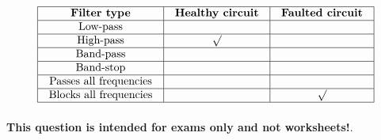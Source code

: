 $$\vbox{\offinterlineskip
\halign{\strut
\vrule \quad\hfil # \ \hfil & 
\vrule \quad\hfil # \ \hfil & 
\vrule \quad\hfil # \ \hfil \vrule \cr
\noalign{\hrule}
%
{\bf Filter type} & {\bf Healthy circuit} & {\bf Faulted circuit} \cr
%
\noalign{\hrule}
%
Low-pass &  &  \cr
%
\noalign{\hrule}
%
High-pass & $\surd$ &  \cr
%
\noalign{\hrule}
%
Band-pass &  &  \cr
%
\noalign{\hrule}
%
Band-stop &  &  \cr
%
\noalign{\hrule}
%
Passes all frequencies &  &  \cr
%
\noalign{\hrule}
%
Blocks all frequencies &  & $\surd$ \cr
%
\noalign{\hrule}
} %
}$$ %








{\bf This question is intended for exams only and not worksheets!}.



